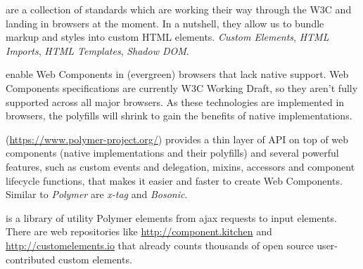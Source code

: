 \begin{description}
\itemsep1pt\parskip0pt
        \item[Web Components] are a collection of standards which are working their way through the W3C and landing in browsers at the moment. In a nutshell, they allow us to bundle markup and styles into custom HTML elements.
\emph{Custom Elements}\cite{custom-elements}, \emph{HTML Imports}\cite{html-imports}, \emph{HTML Templates}\cite{html-templates}, \emph{Shadow DOM}\cite{shadow-dom}.
        \item[webcomponent.js polyfills] enable Web Components in (evergreen) browsers that lack native support.
Web Components specifications are currently W3C Working Draft, so they aren’t fully supported across all major browsers.
As these technologies are implemented in browsers, the polyfills will shrink to gain the benefits of native implementations. \cite{webcomponents-polyfills} 
        \item[Polymer library] (\url{https://www.polymer-project.org/}) provides a thin layer of API on top of web components (native implementations and their polyfills) and several powerful features, such as custom events and delegation, mixins, accessors and component lifecycle functions, that makes it easier and faster to create Web Components. Similar to \emph{Polymer} are \emph{x-tag} and \emph{Bosonic}.
        \item[iron-elements] \cite{iron-elements} is a library of utility Polymer elements from ajax requests to input elements. 
There are web repositories like \url{http://component.kitchen} and \url{http://customelements.io} that already counts thousands of open source user-contributed custom elements.
\end{description}


 
